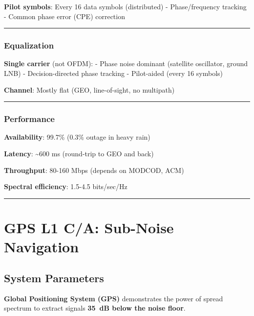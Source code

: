 \textbf{Pilot symbols}: Every 16 data symbols (distributed) -
Phase/frequency tracking - Common phase error (CPE) correction

\begin{center}\rule{0.5\linewidth}{0.5pt}\end{center}

\subsubsection{Equalization}\label{equalization-1}

\textbf{Single carrier} (not OFDM): - Phase noise dominant (satellite
oscillator, ground LNB) - Decision-directed phase tracking - Pilot-aided
(every 16 symbols)

\textbf{Channel}: Mostly flat (GEO, line-of-sight, no multipath)

\begin{center}\rule{0.5\linewidth}{0.5pt}\end{center}

\subsubsection{Performance}\label{performance-2}

\textbf{Availability}: 99.7\% (0.3\% outage in heavy rain)

\textbf{Latency}: \textasciitilde600 ms (round-trip to GEO and back)

\textbf{Throughput}: 80-160 Mbps (depends on MODCOD, ACM)

\textbf{Spectral efficiency}: 1.5-4.5 bits/sec/Hz

\begin{center}\rule{0.5\linewidth}{0.5pt}\end{center}

\section{GPS L1 C/A: Sub-Noise Navigation}
\label{sec:gps}

\subsection{System Parameters}

\textbf{Global Positioning System (GPS)} demonstrates the power of spread spectrum to extract signals \textbf{35~dB below the noise floor}.

